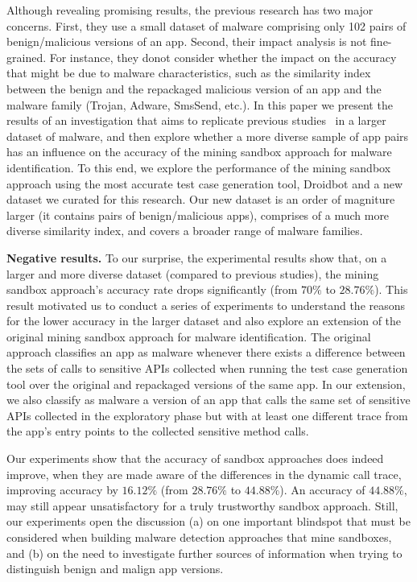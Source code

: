 Although revealing promising results, the previous research has two major concerns. First, they use a small dataset of malware comprising only 102 pairs of benign/malicious versions of an app. Second, their impact analysis is not fine-grained. For instance, they donot consider whether the impact on the accuracy that might be due to malware characteristics, such as the similarity index between the benign and the repackaged malicious version of an app and the malware family (Trojan, Adware, SmsSend, etc.). In this paper we present the results of an investigation that aims to replicate previous studies~\cite{DBLP:conf/wcre/BaoLL18,DBLP:conf/scam/CostaMCMVBC20} in a larger dataset of malware, and then explore whether a more diverse sample of app pairs has an influence on the accuracy of the mining sandbox approach for malware identification. To this end, we explore the performance of the mining sandbox approach using the most accurate test case generation tool, Droidbot and a new dataset we curated for this research. Our new dataset is an order of magniture larger (it contains \apps pairs of benign/malicious apps), comprises of a much more diverse similarity index, and covers a broader range of malware families. 



{\bf Negative results.} To our surprise, the experimental results show that, on a larger and more diverse dataset (compared to previous studies), the mining sandbox approach's accuracy rate drops significantly (from $70\%$ to $28.76\%$). This result motivated us to conduct a series of experiments to understand the reasons for the lower accuracy in the larger dataset and also explore an extension of the original mining sandbox approach for malware identification. The original approach classifies an app as malware whenever there exists a difference between the sets of calls to sensitive APIs collected when running the test case generation tool over the original and repackaged versions of the same app. In our extension, we also classify as malware a version of an app that calls the same set of sensitive APIs collected in the exploratory phase but with at least one different trace from the app's entry points to the collected sensitive method calls.


Our experiments show that the accuracy of sandbox approaches does indeed improve, when they are made aware of the differences in the dynamic call trace, improving accuracy by $16.12\%$ (from $28.76\%$ to $44.88\%$). 
An accuracy of $44.88\%$, may still appear unsatisfactory for a truly trustworthy sandbox approach. Still, 
our experiments open the discussion (a) on one important blindspot that must be considered when building 
malware detection approaches that mine sandboxes, and (b) on the need to investigate further sources of information when trying to distinguish benign and malign app versions. 

